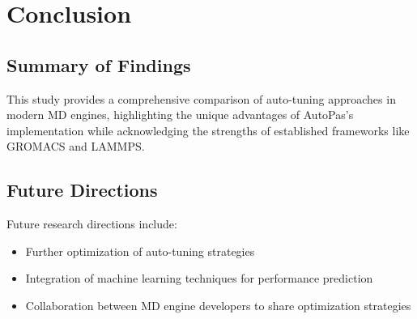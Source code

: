 \documentclass[conference]{IEEEtran}
\begin{document}
\section{Conclusion}

\subsection{Summary of Findings}

This study provides a comprehensive comparison of auto-tuning approaches in modern MD engines, highlighting the unique advantages of AutoPas's implementation while acknowledging the strengths of established frameworks like GROMACS and LAMMPS.

\subsection{Future Directions}

Future research directions include:
\begin{itemize}
    \item Further optimization of auto-tuning strategies
    \item Integration of machine learning techniques for performance prediction
    \item Collaboration between MD engine developers to share optimization strategies
\end{itemize}

\cite{Gratl2019AutoPasAF}







\newpage
\newpage
\tableofcontents
\end{document}

